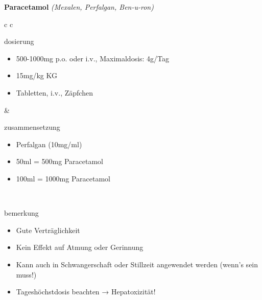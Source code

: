 \begin{frame}{
    \textbf{Paracetamol}
    \textit{(Mexalen, Perfalgan, Ben-u-ron)}
}
    \begin{tabular}{c c}
        \begin{beamercolorbox}[wd=\boxwidth\textwidth,ht=\boxheight\textheight,sep=1em]{dosierung}
            \begin{itemize}
                \item 500-1000mg p.o. oder i.v., Maximaldosis: 4g/Tag
                \item 15mg/kg KG
                \item Tabletten, i.v., Zäpfchen
            \end{itemize}
        \end{beamercolorbox} & 
        \begin{beamercolorbox}[wd=\boxwidth\textwidth,ht=\boxheight\textheight,sep=1em]{zusammensetzung}
            \begin{itemize}
                \item Perfalgan (10mg/ml)
                \item 50ml = 500mg Paracetamol
                \item 100ml = 1000mg Paracetamol
            \end{itemize}
        \end{beamercolorbox} \\
        \begin{beamercolorbox}[wd=\textwidth,ht=\boxheight\textheight,sep=1em]{bemerkung}
            \begin{itemize}
                \item Gute Verträglichkeit
                \item Kein Effekt auf Atmung oder Gerinnung
                \item Kann auch in Schwangerschaft oder Stillzeit angewendet werden (wenn’s sein muss!)
                \item Tageshöchstdosis beachten → Hepatoxizität!
            \end{itemize}
        \end{beamercolorbox} \\
    \end{tabular}
\end{frame}

